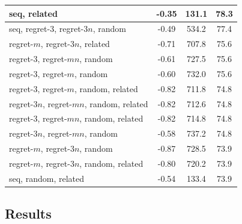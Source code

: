 \documentclass[9pt,xcolor={dvipsnames}]{beamer}
\begin{document}
\begin{frame}
{\begin{table}[]
{\begin{tabular}{|l|c|c|c|}
seq, related         & -0.35             & 131.1             & 78.3                     \\ \hline
seq, regret-3, regret-$3n$, random                                   & -0.49             & 534.2             & 77.4                      \\ \hline
regret-$m$, regret-$3n$, related  & -0.71             & 707.8             & 75.6                      \\ \hline
regret-3, regret-$mn$, random                                        & -0.61             & 727.5             & 75.6                      \\ \hline
regret-3, regret-$m$, random  & -0.60              & 732.0                & 75.6                      \\ \hline
regret-3, regret-$m$, random, related    & -0.82             & 711.8             & 74.8                     \\ \hline
regret-$3n$, regret-$mn$, random, related                            & -0.82             & 712.6              & 74.8                      \\ \hline
regret-3, regret-$mn$, random, related     & -0.82             & 714.8             & 74.8                      \\ \hline
regret-$3n$, regret-$mn$, random   & -0.58             & 737.2             & 74.8                      \\ \hline
regret-$m$, regret-$3n$, random   & -0.87             & 728.5             & 73.9                      \\ \hline
regret-$m$, regret-$3n$, random, related                             & -0.80              & 720.2             & 73.9                      \\ \hline
seq, random, related                                                 & -0.54             & 133.4              & 73.9   \\ \hline 
\end{tabular} }
\end{table}
}
\end{frame}

\subsection{Results}
\end{document}
